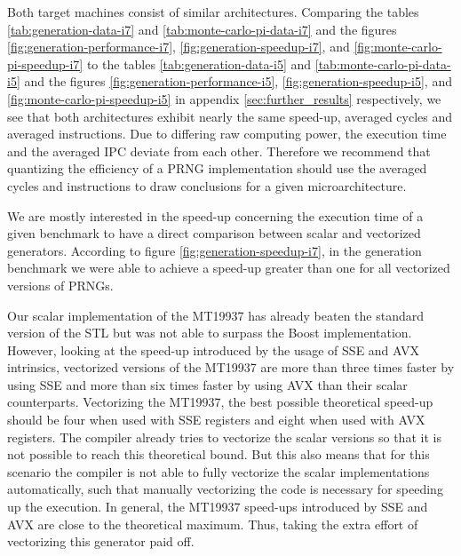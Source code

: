 \documentclass{stdlocal}
\begin{document}
    Both target machines consist of similar architectures.
    Comparing the tables \ref{tab:generation-data-i7} and \ref{tab:monte-carlo-pi-data-i7} and the figures \ref{fig:generation-performance-i7}, \ref{fig:generation-speedup-i7}, and \ref{fig:monte-carlo-pi-speedup-i7} to the tables \ref{tab:generation-data-i5} and \ref{tab:monte-carlo-pi-data-i5} and the figures \ref{fig:generation-performance-i5}, \ref{fig:generation-speedup-i5}, and \ref{fig:monte-carlo-pi-speedup-i5} in appendix \ref{sec:further_results} respectively, we see that both architectures exhibit nearly the same speed-up, averaged cycles and averaged instructions.
    Due to differing raw computing power, the execution time and the averaged IPC deviate from each other.
    Therefore we recommend that quantizing the efficiency of a PRNG implementation should use the averaged cycles and instructions to draw conclusions for a given microarchitecture.

    We are mostly interested in the speed-up concerning the execution time of a given benchmark to have a direct comparison between scalar and vectorized generators.
    According to figure \ref{fig:generation-speedup-i7}, in the generation benchmark we were able to achieve a speed-up greater than one for all vectorized versions of PRNGs.

    Our scalar implementation of the MT19937 has already beaten the standard version of the STL but was not able to surpass the Boost implementation.
    However, looking at the speed-up introduced by the usage of SSE and AVX intrinsics, vectorized versions of the MT19937 are more than three times faster by using SSE and more than six times faster by using AVX than their scalar counterparts.
    Vectorizing the MT19937, the best possible theoretical speed-up should be four when used with SSE registers and eight when used with AVX registers.
    The compiler already tries to vectorize the scalar versions so that it is not possible to reach this theoretical bound.
    But this also means that for this scenario the compiler is not able to fully vectorize the scalar implementations automatically, such that manually vectorizing the code is necessary for speeding up the execution.
    In general, the MT19937 speed-ups introduced by SSE and AVX are close to the theoretical maximum.
    Thus, taking the extra effort of vectorizing this generator paid off.
\end{document}
